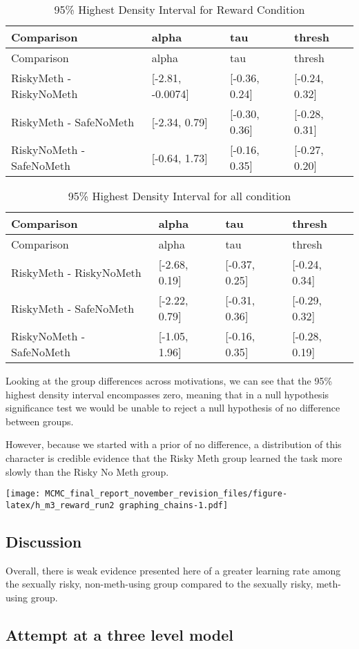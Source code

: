 \documentclass[]{article}
\begin{document}
\begin{longtable}[]{@{}llll@{}}
\caption{95\% Highest Density Interval for Reward
Condition}\tabularnewline
\toprule
Comparison & alpha & tau & thresh\tabularnewline
\midrule
\endfirsthead
\toprule
Comparison & alpha & tau & thresh\tabularnewline
\midrule
\endhead
RiskyMeth - RiskyNoMeth & {[}-2.81, -0.0074{]} & {[}-0.36, 0.24{]} &
{[}-0.24, 0.32{]}\tabularnewline
RiskyMeth - SafeNoMeth & {[}-2.34, 0.79{]} & {[}-0.30, 0.36{]} &
{[}-0.28, 0.31{]}\tabularnewline
RiskyNoMeth - SafeNoMeth & {[}-0.64, 1.73{]} & {[}-0.16, 0.35{]} &
{[}-0.27, 0.20{]}\tabularnewline
\bottomrule
\end{longtable}

\begin{longtable}[]{@{}llll@{}}
\caption{95\% Highest Density Interval for all condition}\tabularnewline
\toprule
Comparison & alpha & tau & thresh\tabularnewline
\midrule
\endfirsthead
\toprule
Comparison & alpha & tau & thresh\tabularnewline
\midrule
\endhead
RiskyMeth - RiskyNoMeth & {[}-2.68, 0.19{]} & {[}-0.37, 0.25{]} &
{[}-0.24, 0.34{]}\tabularnewline
RiskyMeth - SafeNoMeth & {[}-2.22, 0.79{]} & {[}-0.31, 0.36{]} &
{[}-0.29, 0.32{]}\tabularnewline
RiskyNoMeth - SafeNoMeth & {[}-1.05, 1.96{]} & {[}-0.16, 0.35{]} &
{[}-0.28, 0.19{]}\tabularnewline
\bottomrule
\end{longtable}

Looking at the group differences across motivations, we can see that the
95\% highest density interval encompasses zero, meaning that in a null
hypothesis significance test we would be unable to reject a null
hypothesis of no difference between groups.

However, because we started with a prior of no difference, a
distribution of this character is credible evidence that the Risky Meth
group learned the task more slowly than the Risky No Meth group.

\texttt{[image: MCMC\_final\_report\_november\_revision\_files/figure-latex/h\_m3\_reward\_run2 graphing\_chains-1.pdf]}

\subsection{Discussion}\label{discussion}

Overall, there is weak evidence presented here of a greater learning
rate among the sexually risky, non-meth-using group compared to the
sexually risky, meth-using group.

\subsection{Attempt at a three level
model}\label{attempt-at-a-three-level-model}
\end{document}
